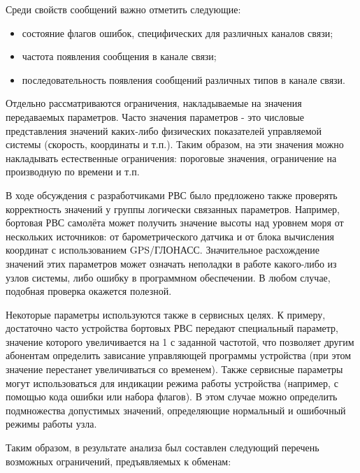 Среди свойств сообщений важно отметить следующие:

\begin{itemize}
 \item состояние флагов ошибок, специфических для различных каналов связи;
 \item частота появления сообщения в канале связи;
 \item последовательность появления сообщений различных типов в канале связи.
\end{itemize}

Отдельно рассматриваются ограничения, накладываемые на значения передаваемых 
параметров. Часто значения параметров - это числовые представления значений 
каких-либо физических показателей управляемой системы (скорость, координаты и 
т.п.). Таким образом, на эти значения можно накладывать естественные 
ограничения: пороговые значения, ограничение на производную по времени и т.п.

В ходе обсуждения с разработчиками РВС было предложено также проверять 
корректность значений у группы логически связанных параметров. Например, 
бортовая РВС самолёта может получить значение высоты над уровнем моря от 
нескольких источников: от барометрического датчика и от блока вычисления 
координат с использованием GPS/ГЛОНАСС. Значительное расхождение значений 
этих параметров может означать неполадки в работе какого-либо из узлов системы, 
либо ошибку в программном обеспечении. В любом случае, подобная проверка 
окажется полезной.

Некоторые параметры используются также в сервисных целях. К примеру, 
достаточно часто устройства бортовых РВС передают специальный 
параметр, значение которого увеличивается на 1 с заданной частотой, что 
позволяет другим абонентам определить зависание управляющей программы 
устройства (при этом значение перестанет увеличиваться со временем). Также 
сервисные параметры могут использоваться для индикации режима работы устройства 
(например, с помощью кода ошибки или набора флагов). В этом случае можно 
определить подмножества допустимых значений, определяющие нормальный и 
ошибочный режимы работы узла.

Таким образом, в результате анализа был составлен следующий перечень 
возможных ограничений, предъявляемых к обменам:

